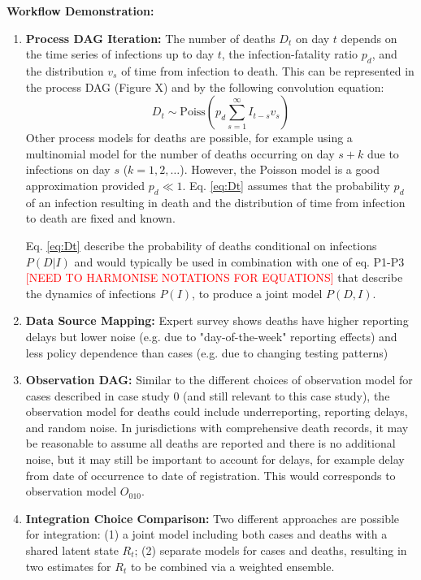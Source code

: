\documentclass{article}
\begin{document}
\textbf{Workflow Demonstration:}
\begin{enumerate}
    \item \textbf{Process DAG Iteration:} The number of deaths $D_t$ on day $t$ depends on the time series of infections up to day $t$, the infection-fatality ratio $p_d$, and the distribution $v_s$ of time from infection to death. This can be represented in the process DAG (Figure X) and by the following convolution equation:
    \begin{equation} \label{eq:Dt}
        D_t \sim \mathrm{Poiss}\left(p_d \sum_{s=1}^\infty I_{t-s}v_s \right)
    \end{equation}
    Other process models for deaths are possible, for example using a multinomial model for the number of deaths occurring on day $s+k$ due to infections on day $s$ ($k=1,2,\ldots$). However, the Poisson model is a good approximation provided $p_d\ll 1$.
    Eq. \eqref{eq:Dt} assumes that the probability $p_d$ of an infection resulting in death and the distribution of time from infection to death are fixed and known.
    
    Eq. \eqref{eq:Dt} describe the probability of deaths conditional on infections $P(D | I)$ and would typically be used in combination with one of eq. P1-P3 \textcolor{red}{[NEED TO HARMONISE NOTATIONS FOR EQUATIONS]} that describe the dynamics of infections $P(I)$, to produce a joint model $P(D, I)$. 
    \item \textbf{Data Source Mapping:} Expert survey shows deaths have higher reporting delays but lower noise (e.g. due to "day-of-the-week" reporting effects) and less policy dependence than cases (e.g. due to changing testing patterns)
    \item \textbf{Observation DAG:} Similar to the different choices of observation model for cases described in case study 0 (and still relevant to this case study), the observation model for deaths could include underreporting, reporting delays, and random noise. In jurisdictions with comprehensive death records, it may be reasonable to assume all deaths are reported and there is no additional noise, but it may still be important to account for delays, for example delay from date of occurrence to date of registration. This would corresponds to observation model $O_{010}$.
    \item \textbf{Integration Choice Comparison:} 
       Two different approaches are possible for integration: (1) a joint model including both cases and deaths with a shared latent state $R_t$; (2) separate models for cases and deaths, resulting in two estimates for $R_t$ to be combined via a weighted ensemble. 
       

\end{enumerate}
\end{document}
